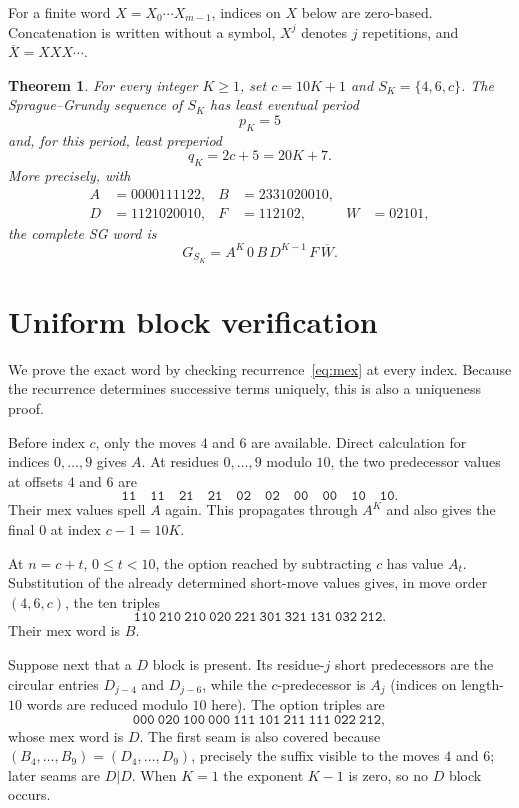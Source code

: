 \documentclass[11pt]{article}
\newtheorem{theorem}{Theorem}
\begin{document}
For a finite word $X=X_0\cdots X_{m-1}$, indices on $X$ below are
zero-based.  Concatenation is written without a symbol, $X^j$ denotes
$j$ repetitions, and $\overline X=XXX\cdots$.

\begin{theorem}\label{thm:main}
For every integer $K\geq1$, set $c=10K+1$ and
$S_K=\{4,6,c\}$.  The Sprague--Grundy sequence of $S_K$ has least
eventual period
\[
 p_K=5
\]
and, for this period, least preperiod
\[
 q_K=2c+5=20K+7.
\]
More precisely, with
\begin{align*}
 A&=0000111122, & B&=2331020010,\\
 D&=1121020010, & F&=112102, & W&=02101,
\end{align*}
the complete SG word is
\begin{equation}\label{eq:word}
 G_{S_K}=A^K\,0\,B\,D^{K-1}\,F\,\overline W.
\end{equation}
\end{theorem}

\section{Uniform block verification}

We prove the exact word by checking recurrence~\eqref{eq:mex} at every
index.  Because the recurrence determines successive terms uniquely,
this is also a uniqueness proof.

Before index $c$, only the moves $4$ and $6$ are available.  Direct
calculation for indices $0,\ldots,9$ gives $A$.  At residues
$0,\ldots,9$ modulo $10$, the two predecessor values at offsets $4$ and
$6$ are
\[
 \texttt{11}\quad\texttt{11}\quad\texttt{21}\quad\texttt{21}
 \quad\texttt{02}\quad\texttt{02}\quad\texttt{00}\quad
 \texttt{00}\quad\texttt{10}\quad\texttt{10}.
\]
Their mex values spell $A$ again.  This propagates through $A^K$ and
also gives the final $0$ at index $c-1=10K$.

At $n=c+t$, $0\leq t<10$, the option reached by subtracting $c$ has
value $A_t$.  Substitution of the already determined short-move values
gives, in move order $(4,6,c)$, the ten triples
\begin{equation}\label{eq:Btable}
 \texttt{110}\ \texttt{210}\ \texttt{210}\ \texttt{020}\
 \texttt{221}\ \texttt{301}\ \texttt{321}\ \texttt{131}\
 \texttt{032}\ \texttt{212}.
\end{equation}
Their mex word is $B$.

Suppose next that a $D$ block is present.  Its residue-$j$ short
predecessors are the circular entries $D_{j-4}$ and $D_{j-6}$, while
the $c$-predecessor is $A_j$ (indices on length-$10$ words are reduced
modulo $10$ here).  The option triples are
\begin{equation}\label{eq:Dtable}
 \texttt{000}\ \texttt{020}\ \texttt{100}\ \texttt{000}\
 \texttt{111}\ \texttt{101}\ \texttt{211}\ \texttt{111}\
 \texttt{022}\ \texttt{212},
\end{equation}
whose mex word is $D$.  The first seam is also covered because
$(B_4,\ldots,B_9)=(D_4,\ldots,D_9)$, precisely the suffix visible to
the moves $4$ and $6$; later seams are $D|D$.  When $K=1$ the exponent
$K-1$ is zero, so no $D$ block occurs.
\end{document}

